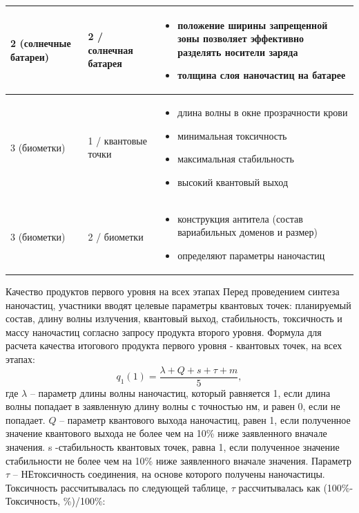 \begin{longtable}{|p{3cm}|p{3cm}|p{8cm}|}
	2 (солнечные батареи)	& 2 / солнечная батарея		& \begin{itemize} \item положение ширины запрещенной зоны позволяет эффективно разделять носители заряда
		\item толщина слоя наночастиц на батарее \end{itemize} \\
		\hline
	3 (биометки)	& 1 / квантовые точки		& \begin{itemize} \item длина волны в окне прозрачности крови
		\item минимальная токсичность
		\item максимальная стабильность
		\item высокий квантовый выход \end{itemize} \\
		\hline
	3 (биометки)	&2 / биометки		& \begin{itemize} \item конструкция антитела (состав вариабильных доменов и размер)
		\item определяют параметры наночастиц \end{itemize} \\
		\hline
\end{longtable}

Качество продуктов первого уровня на всех этапах
Перед проведением синтеза наночастиц, участники вводят целевые параметры квантовых точек: планируемый состав, длину волны излучения, квантовый выход, стабильность, токсичность и массу наночастиц согласно запросу продукта второго уровня. Формула для расчета качества итогового продукта первого уровня - квантовых точек, на всех этапах:
$$q_1 (1)=  \frac{\lambda+Q+s+\tau+m}{5},$$
где $\lambda$ – параметр длины волны наночастиц, который равняется 1, если длина волны попадает в заявленную длину волны с точностью  нм, и равен 0, если не попадает. $Q$ – параметр квантового выхода наночастиц, равен 1, если полученное значение квантового выхода не более чем на 10\% ниже заявленного вначале значения. s -стабильность квантовых точек, равна 1, если полученное значение стабильности не более чем на 10\% ниже заявленного вначале значения. Параметр $\tau$ – НЕтоксичность соединения, на основе которого получены наночастицы. Токсичность рассчитывалась по следующей таблице, $\tau$ рассчитывалась как (100\%-Токсичность, \%)/100\%:

